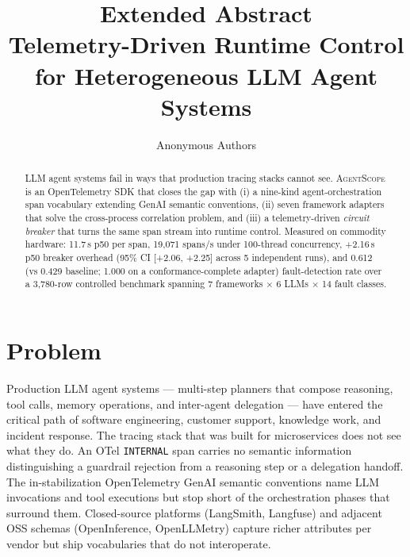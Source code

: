 \documentclass[sigplan,10pt,anonymous,review]{acmart}
\newcommand{\sysname}{\textsc{AgentScope}\xspace}
\begin{document}
\title[Extended Abstract: Telemetry-Driven Runtime Control for LLM Agents]{Extended Abstract \\
Telemetry-Driven Runtime Control for Heterogeneous LLM Agent Systems}

\author{Anonymous Authors}
\renewcommand{\shortauthors}{Anonymous Authors}

\begin{abstract}
LLM agent systems fail in ways that production tracing stacks cannot
see. \sysname{} is an OpenTelemetry SDK that closes the gap with (i) a
nine-kind agent-orchestration span vocabulary extending GenAI semantic
conventions, (ii) seven framework adapters that solve the cross-process
correlation problem, and (iii) a telemetry-driven \emph{circuit breaker}
that turns the same span stream into runtime control. Measured on
commodity hardware: 11.7\,\textmu{}s p50 per span, 19{,}071 spans/s
under 100-thread concurrency, +2.16\,\textmu{}s p50 breaker overhead
(95\% CI [+2.06, +2.25] across 5 independent runs),
and 0.612 (vs 0.429 baseline; 1.000 on a conformance-complete adapter)
fault-detection rate over a 3{,}780-row controlled benchmark spanning
7 frameworks $\times$ 6 LLMs $\times$ 14 fault classes.
\end{abstract}

\maketitle

\section*{Problem}

Production LLM agent systems --- multi-step planners that compose
reasoning, tool calls, memory operations, and inter-agent delegation
--- have entered the critical path of software engineering, customer
support, knowledge work, and incident response. The tracing stack that
was built for microservices does not see what they do. An OTel
\texttt{INTERNAL} span carries no semantic information distinguishing a
guardrail rejection from a reasoning step or a delegation handoff.
The in-stabilization OpenTelemetry GenAI semantic conventions name LLM
invocations and tool executions but stop short of the orchestration
phases that surround them. Closed-source platforms (LangSmith,
Langfuse) and adjacent OSS schemas (OpenInference, OpenLLMetry)
capture richer attributes per vendor but ship vocabularies that do not
interoperate.
\end{document}
